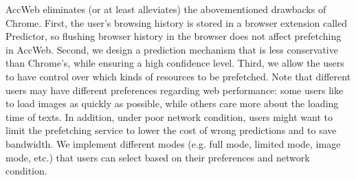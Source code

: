 AccWeb eliminates (or at least alleviates) the abovementioned drawbacks of Chrome. First, the user's browsing history is stored in a browser extension called Predictor, so flushing browser history in the browser does not affect prefetching in AccWeb. Second, we design a prediction mechanism that is less conservative than Chrome's, while ensuring a high confidence level. Third, we allow the users to have control over which kinds of resources to be prefetched. Note that different users may have different preferences regarding web performance: some users like to load images as quickly as possible, while others care more about the loading time of texts. In addition, under poor network condition, users might want to limit the prefetching service to lower the cost of wrong predictions and to save bandwidth. We implement different modes (e.g. full mode, limited mode, image mode, etc.) that users can select based on their preferences and network condition.


